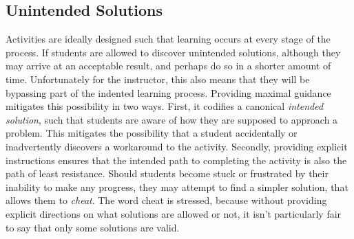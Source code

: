     \subsection{Unintended Solutions}
        Activities are ideally designed such that learning occurs at every stage of the process. 
        If students are allowed to discover unintended solutions, although they may arrive at an acceptable result, and perhaps do so in a shorter amount of time. 
        Unfortunately for the instructor, this also means that they will be bypassing part of the indented learning process. 
        Providing maximal guidance mitigates this possibility in two ways. 
        First, it codifies a canonical \emph{intended solution}, such that students are aware of how they are supposed to approach a problem. 
        This mitigates the possibility that a student accidentally or inadvertently discovers a workaround to the activity. 
        Secondly, providing explicit instructions ensures that the intended path to completing the activity is also the path of least resistance. 
        Should students become stuck or frustrated by their inability to make any progress, they may attempt to find a simpler solution, that allows them to \emph{cheat}. 
        The word cheat is stressed, because without providing explicit directions on what solutions are allowed or not, it isn't particularly fair to say that only some solutions are valid. 




        

